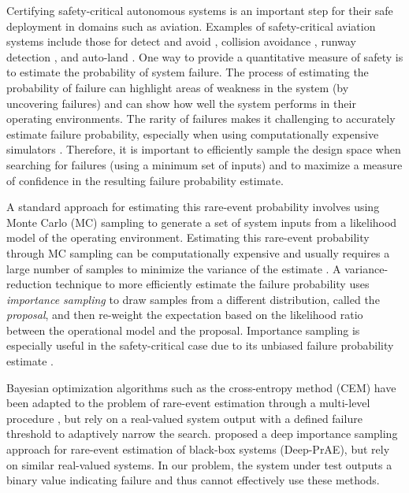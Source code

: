 Certifying safety-critical autonomous systems is an important step for their safe deployment in domains such as aviation. 
Examples of safety-critical aviation systems include those for detect and avoid \cite{do365,owen2019acasxu}, collision avoidance \cite{kochenderfer2012next}, runway detection \cite{khaled2015runway}, and auto-land \cite{balduzzi2021neural}.
One way to provide a quantitative measure of safety is to estimate the probability of system failure.
The process of estimating the probability of failure can highlight areas of weakness in the system (by uncovering failures) and can show how well the system performs in their operating environments.
The rarity of failures makes it challenging to accurately estimate failure probability, especially when using computationally expensive simulators \cite{de2005tutorial}.
Therefore, it is important to efficiently sample the design space when searching for failures (using a minimum set of inputs) and to maximize a measure of confidence in the resulting failure probability estimate.

A standard approach for estimating this rare-event probability involves using Monte Carlo (MC) sampling to generate a set of system inputs from a likelihood model of the operating environment.
Estimating this rare-event probability through MC sampling can be computationally expensive and usually requires a large number of samples to minimize the variance of the estimate \cite{de2005tutorial}.
A variance-reduction technique to more efficiently estimate the failure probability uses \textit{importance sampling} \cite{robert1999monte,owen2013monte} to draw samples from a different distribution, called the \textit{proposal}, and then re-weight the expectation based on the likelihood ratio between the operational model and the proposal.
Importance sampling is especially useful in the safety-critical case due to its unbiased failure probability estimate \cite{owen2013monte}.

Bayesian optimization algorithms such as the cross-entropy method (CEM) \cite{rubinstein2004cross,moss2020crossentropy} have been adapted to the problem of rare-event estimation through a multi-level procedure \cite{de2005tutorial, miller2021rare}, but rely on a real-valued system output with a defined failure threshold to adaptively narrow the search.
\textcite{arief2021deep} proposed a deep importance sampling approach for rare-event estimation of black-box systems (Deep-PrAE), but rely on similar real-valued systems.
In our problem, the system under test outputs a binary value indicating failure and thus cannot effectively use these methods.

